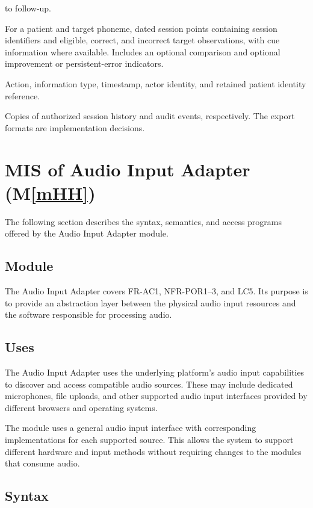 \documentclass[12pt, titlepage]{article}
\newcommand{\mref}[1]{M\ref{#1}}
\begin{document}
\begin{description}
to follow-up.
\item[Progress] For a patient and target phoneme, dated session points
containing session identifiers and eligible, correct, and incorrect target
observations, with cue information where available. Includes an optional
comparison and optional improvement or persistent-error indicators.
\item[AuditEvent] Action, information type, timestamp, actor identity, and
retained patient identity reference.
\item[HistoryExport, AuditCopy] Copies of authorized session history and
audit events, respectively. The export formats are implementation decisions.
\end{description}

\clearpage

\section{MIS of Audio Input Adapter (\mref{mHH})} \label{mis:audio-adapter}

The following section describes the syntax, semantics, and access programs offered by the Audio Input Adapter module.

\subsection{Module}

The Audio Input Adapter covers FR-AC1, NFR-POR1--3, and LC5. Its purpose is to provide an abstraction layer between the physical audio input resources and the software responsible for processing audio.

\subsection{Uses}

The Audio Input Adapter uses the underlying platform's audio input capabilities to discover and access compatible audio sources. These may include dedicated microphones, file uploads, and other supported audio input interfaces provided by different browsers and operating systems.

The module uses a general audio input interface with corresponding implementations for each supported source. This allows the system to support different hardware and input methods without requiring changes to the modules that consume audio.

\subsection{Syntax}
\end{document}
